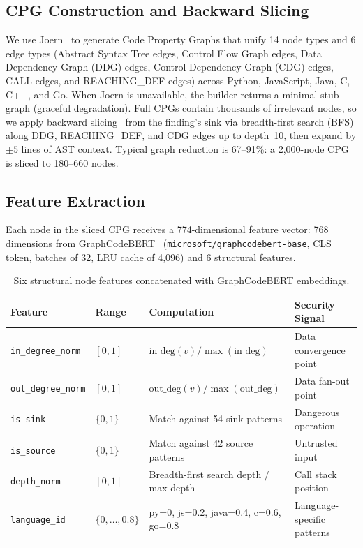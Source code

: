 \subsection{CPG Construction and Backward Slicing}

We use Joern~\cite{cpg2014} to generate Code Property Graphs that unify 14 node types and 6 edge types (Abstract Syntax Tree edges, Control Flow Graph edges, Data Dependency Graph (DDG) edges, Control Dependency Graph (CDG) edges, CALL edges, and REACHING\_DEF edges) across Python, JavaScript, Java, C, C++, and Go. When Joern is unavailable, the builder returns a minimal stub graph (graceful degradation). Full CPGs contain thousands of irrelevant nodes, so we apply backward slicing~\cite{cpg2014} from the finding's sink via breadth-first search (BFS) along DDG, REACHING\_DEF, and CDG edges up to depth~10, then expand by $\pm 5$ lines of AST context. Typical graph reduction is 67--91\%: a 2,000-node CPG is sliced to 180--660 nodes.

\subsection{Feature Extraction}

Each node in the sliced CPG receives a 774-dimensional feature vector: 768 dimensions from GraphCodeBERT~\cite{graphcodebert2021} (\texttt{microsoft/graphcodebert-base}, CLS token, batches of 32, LRU cache of 4,096) and 6 structural features.

\begin{table}[H]
\centering
\small
\caption{Six structural node features concatenated with GraphCodeBERT embeddings.}
\label{tab:structural-features}
\begin{tabular}{llll}
\toprule
\textbf{Feature} & \textbf{Range} & \textbf{Computation} & \textbf{Security Signal} \\
\midrule
\texttt{in\_degree\_norm}  & $[0, 1]$ & $\text{in\_deg}(v) / \max(\text{in\_deg})$ & Data convergence point \\
\texttt{out\_degree\_norm} & $[0, 1]$ & $\text{out\_deg}(v) / \max(\text{out\_deg})$ & Data fan-out point \\
\texttt{is\_sink}          & $\{0, 1\}$ & Match against 54 sink patterns & Dangerous operation \\
\texttt{is\_source}        & $\{0, 1\}$ & Match against 42 source patterns & Untrusted input \\
\texttt{depth\_norm}       & $[0, 1]$ & Breadth-first search depth / max depth & Call stack position \\
\texttt{language\_id}      & $\{0, \ldots, 0.8\}$ & py=0, js=0.2, java=0.4, c=0.6, go=0.8 & Language-specific patterns \\
\bottomrule
\end{tabular}
\end{table}

